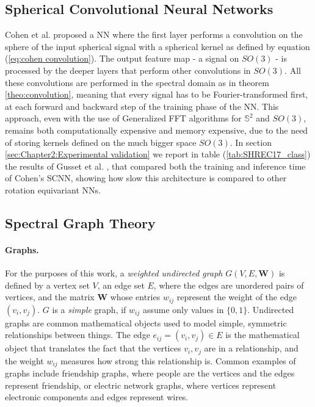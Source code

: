\subsection{Spherical Convolutional Neural Networks}\label{sec:Chapter1:SCNN}
Cohen et al. \cite{SCNN} proposed a NN where the first layer performs a convolution on the sphere of the input spherical signal with a spherical kernel as defined by equation (\ref{eq:cohen convolution}). The output feature map - a signal on $SO(3)$ - is processed by the deeper layers that perform other convolutions in $SO(3)$. All these convolutions are performed in the spectral domain as in theorem \ref{theo:convolution}, meaning that every signal has to be Fourier-transformed first, at each forward and backward step of the training phase of the NN. This approach, even with the use of Generalized FFT algorithms for $\mathbb S^2$ and $SO(3)$, remains both computationally expensive and memory expensive, due to the need of storing kernels defined on the much bigger space $SO(3)$. In section \ref{sec:Chapter2:Experimental validation} we report in table (\ref{tab:SHREC17_class}) the results of Gusset et al. \cite{Gusset}, that compared both the training and inference time of Cohen's SCNN, showing how slow this architecture is compared to other rotation equivariant NNs.
\subsection{Spectral Graph Theory} \label{sec:Chapter1: Spectral Graph Theory}
\paragraph{Graphs.}
For the purposes of this work, a \textit{weighted undirected graph} $G(V, E, \mathbf W)$ is defined by a vertex set $V$, an edge set $E$, where the edges are unordered pairs of vertices, and the matrix $\mathbf W$ whose entries $w_{ij}$ represent the weight of the edge $(v_i, v_j)$. $G$ is a \textit{simple} graph, if $w_{ij}$ assume only values in $\{0, 1\}$. Undirected graphs are common mathematical objects used to model simple, symmetric relationships between things. The edge $e_{ij} = (v_i, v_j) \in E$ is the mathematical object that translates the fact that the vertices $v_i, v_j$ are in a relationship, and the weight $w_{ij}$ measures how strong this relationship is. Common examples of graphs include friendship graphs, where people are the vertices and the edges represent friendship, or electric network graphs, where vertices represent electronic components and edges represent wires.
